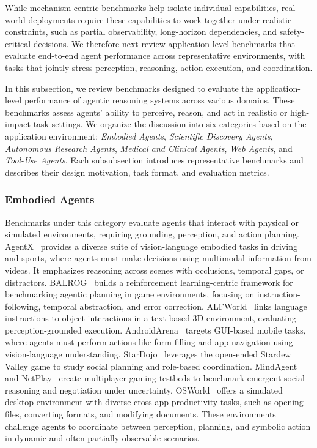 While mechanism-centric benchmarks help isolate individual capabilities, real-world deployments require these capabilities to work together under realistic constraints, such as partial observability, long-horizon dependencies, and safety-critical decisions. We therefore next review application-level benchmarks that evaluate end-to-end agent performance across representative environments, with tasks that jointly stress perception, reasoning, action execution, and coordination.

In this subsection, we review benchmarks designed to evaluate the application-level performance of agentic reasoning systems across various domains. These benchmarks assess agents' ability to perceive, reason, and act in realistic or high-impact task settings. We organize the discussion into six categories based on the application environment: \textit{Embodied Agents}, \textit{Scientific Discovery Agents}, \textit{Autonomous Research Agents}, \textit{Medical and Clinical Agents}, \textit{Web Agents}, and \textit{Tool-Use Agents}. Each subsubsection introduces representative benchmarks and describes their design motivation, task format, and evaluation metrics.

\subsubsection{Embodied Agents}
Benchmarks under this category evaluate agents that interact with physical or simulated environments, requiring grounding, perception, and action planning. AgentX~\cite{tajamul2025agentx} provides a diverse suite of vision-language embodied tasks in driving and sports, where agents must make decisions using multimodal information from videos. It emphasizes reasoning across scenes with occlusions, temporal gaps, or distractors. BALROG~\cite{davide2024balrog} builds a reinforcement learning-centric framework for benchmarking agentic planning in game environments, focusing on instruction-following, temporal abstraction, and error correction. ALFWorld~\cite{shridhar2020alfworld} links language instructions to object interactions in a text-based 3D environment, evaluating perception-grounded execution. AndroidArena~\cite{mingzhe2024understanding} targets GUI-based mobile tasks, where agents must perform actions like form-filling and app navigation using vision-language understanding. StarDojo~\cite{weihao2025stardojo} leverages the open-ended Stardew Valley game to study social planning and role-based coordination. MindAgent~\cite{ran2023mindagent} and NetPlay~\cite{dominik2024playing} create multiplayer gaming testbeds to benchmark emergent social reasoning and negotiation under uncertainty. OSWorld~\cite{tianbao2024osworld} offers a simulated desktop environment with diverse cross-app productivity tasks, such as opening files, converting formats, and modifying documents. These environments challenge agents to coordinate between perception, planning, and symbolic action in dynamic and often partially observable scenarios.

